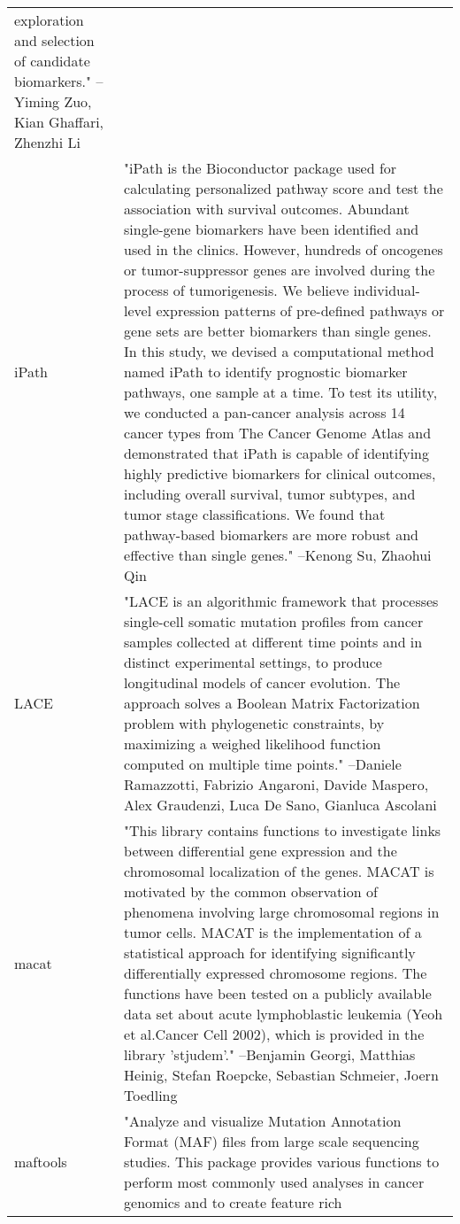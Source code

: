 \begin{longtable}[t]{l>{\raggedright\arraybackslash}p{25em}}
exploration and selection of candidate biomarkers." --Yiming Zuo, Kian Ghaffari, Zhenzhi Li\\
iPath & "iPath is the Bioconductor package used for calculating
personalized pathway score and test the association with
survival outcomes. Abundant single-gene biomarkers have been
identified and used in the clinics. However, hundreds of
oncogenes or tumor-suppressor genes are involved during the
process of tumorigenesis. We believe individual-level
expression patterns of pre-defined pathways or gene sets are
better biomarkers than single genes. In this study, we devised
a computational method named iPath to identify prognostic
biomarker pathways, one sample at a time. To test its utility,
we conducted a pan-cancer analysis across 14 cancer types from
The Cancer Genome Atlas and demonstrated that iPath is capable
of identifying highly predictive biomarkers for clinical
outcomes, including overall survival, tumor subtypes, and tumor
stage classifications. We found that pathway-based biomarkers
are more robust and effective than single genes." --Kenong Su, Zhaohui Qin\\
\addlinespace
LACE & "LACE is an algorithmic framework that processes
single-cell somatic mutation profiles from cancer samples
collected at different time points and in distinct experimental
settings, to produce longitudinal models of cancer evolution.
The approach solves a Boolean Matrix Factorization problem with
phylogenetic constraints, by maximizing a weighed likelihood
function computed on multiple time points." --Daniele Ramazzotti, Fabrizio Angaroni, Davide Maspero, Alex Graudenzi, Luca De Sano, Gianluca Ascolani\\
macat & "This library contains functions to investigate links
between differential gene expression and the chromosomal
localization of the genes. MACAT is motivated by the common
observation of phenomena involving large chromosomal regions in
tumor cells. MACAT is the implementation of a statistical
approach for identifying significantly differentially expressed
chromosome regions. The functions have been tested on a
publicly available data set about acute lymphoblastic leukemia
(Yeoh et al.Cancer Cell 2002), which is provided in the library
'stjudem'." --Benjamin Georgi, Matthias Heinig, Stefan Roepcke, Sebastian Schmeier, Joern Toedling\\
maftools & "Analyze and visualize Mutation Annotation Format (MAF)
files from large scale sequencing studies. This package
provides various functions to perform most commonly used
analyses in cancer genomics and to create feature rich

\end{longtable}
